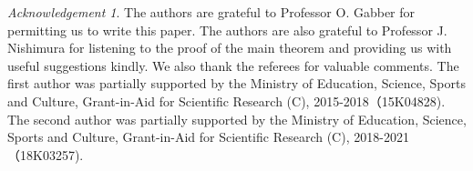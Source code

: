 \documentclass[11pt,a4paper]{amsart}
\theoremstyle{definition}
\theoremstyle{remark}
\newtheorem{acknowledgement}{Acknowledgement}
\begin{document}
\begin{acknowledgement}
The authors are grateful to Professor O. Gabber for permitting us to write this paper. The authors are also grateful to Professor J. Nishimura for listening to the proof of the main theorem and providing us with useful suggestions kindly. 
We also thank the referees for valuable comments.
The first author was partially supported by the Ministry of Education, Science, Sports and Culture, Grant-in-Aid for Scientific Research (C), 2015-2018（15K04828). The second author was partially supported by the Ministry of Education, Science, Sports and Culture, Grant-in-Aid for Scientific Research (C), 2018-2021（18K03257).
\end{acknowledgement}
\end{document}
